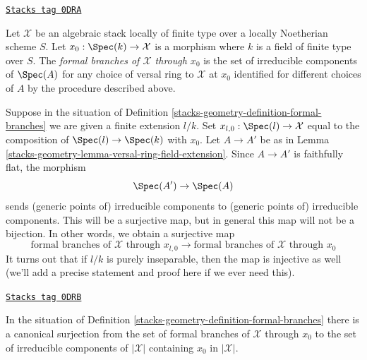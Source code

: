 \begin{definition}
\label{stacks-geometry-definition-formal-branches}
\href{https://stacks.math.columbia.edu/tag/0DRA}{\texttt{Stacks tag 0DRA}}

Let $\mathcal{X}$ be an algebraic stack locally of finite type
over a locally Noetherian scheme $S$. Let $x_0 : \Spec(k) \to \mathcal{X}$
is a morphism where $k$ is a field of finite type over $S$.
The {\it formal branches of $\mathcal{X}$ through $x_0$}
is the set of irreducible components of $\Spec(A)$
for any choice of versal ring to $\mathcal{X}$ at $x_0$
identified for different choices of $A$ by the procedure described above.
\end{definition}

Suppose in the situation of Definition \ref{stacks-geometry-definition-formal-branches}
we are given a finite extension $l/k$. Set
$x_{l, 0} : \Spec(l) \to \mathcal{X}$ equal to the composition of
$\Spec(l) \to \Spec(k)$ with $x_0$. Let
$A \to A'$ be as in Lemma \ref{stacks-geometry-lemma-versal-ring-field-extension}.
Since $A \to A'$ is faithfully flat, the morphism
$$
\Spec(A') \to \Spec(A)
$$
sends (generic points of) irreducible components to
(generic points of) irreducible components.
This will be a surjective map, but
in general this map will not be a bijection.
In other words, we obtain a surjective map
$$
\text{formal branches of }\mathcal{X}\text{ through }x_{l, 0}
\longrightarrow
\text{formal branches of }\mathcal{X}\text{ through }x_0
$$
It turns out that if $l/k$ is purely inseparable, then
the map is injective as well (we'll add a precise statement
and proof here if we ever need this).

\begin{lemma}[Branches]
\label{stacks-geometry-lemma-branches}
\href{https://stacks.math.columbia.edu/tag/0DRB}{\texttt{Stacks tag 0DRB}}

In the situation of Definition \ref{stacks-geometry-definition-formal-branches}
there is a canonical surjection from the set of formal branches of
$\mathcal{X}$ through $x_0$ to the set of irreducible components of
$|\mathcal{X}|$ containing $x_0$ in $|\mathcal{X}|$.
\end{lemma}

